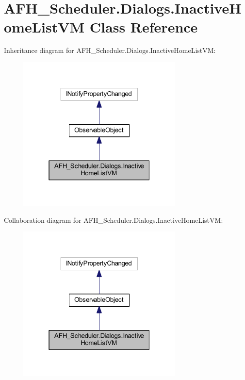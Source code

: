 \section{A\+F\+H\+\_\+\+Scheduler.\+Dialogs.\+Inactive\+Home\+List\+VM Class Reference}
\label{class_a_f_h___scheduler_1_1_dialogs_1_1_inactive_home_list_v_m}


Inheritance diagram for A\+F\+H\+\_\+\+Scheduler.\+Dialogs.\+Inactive\+Home\+List\+VM\+:
\nopagebreak
\begin{figure}[H]
\begin{center}
\leavevmode
\includegraphics[width=235pt]{class_a_f_h___scheduler_1_1_dialogs_1_1_inactive_home_list_v_m__inherit__graph}
\end{center}
\end{figure}


Collaboration diagram for A\+F\+H\+\_\+\+Scheduler.\+Dialogs.\+Inactive\+Home\+List\+VM\+:
\nopagebreak
\begin{figure}[H]
\begin{center}
\leavevmode
\includegraphics[width=235pt]{class_a_f_h___scheduler_1_1_dialogs_1_1_inactive_home_list_v_m__coll__graph}
\end{center}
\end{figure}
